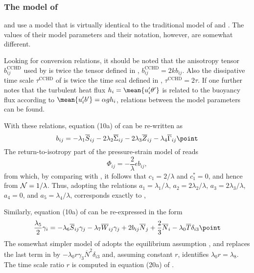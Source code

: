 \subsubsection{The model of \cite{Canutoetal2001a}}
\cite{Canutoetal2001a} and \cite{Chengetal2002} use a model 
that is virtually identical to the traditional model of
\cite{Launderetal75} and \cite{GibsonLaunder78}. The values 
of their model parameters and their notation, however, are somewhat
different.

Looking for conversion relations, it should be noted that the
anisotropy tensor $b^\text{CCHD}_{ij}$ used by \cite{Canutoetal2001a}
is twice the tensor defined in , $b^\text{CCHD}_{ij} = 2 k
b_{ij}$. Also the dissipative time scale $\tau^\text{CCHD}$ of
\cite{Canutoetal2001a} is twice the time scal defined in ,
$\tau^\text{CCHD} = 2 \tau$. If one further notes that the turbulent
heat flux $h_i=\mean{u'_i \theta'}$ is related to the buoyancy flux
according to $\mean{u'_i b'} = \alpha g h_i$, relations between the
model parameters can be found.

With these relations, equation (10a) of \cite{Canutoetal2001a} can be 
re-written as
\begin{equation}
  \label{bASMCHCD2001} 
    b_{ij} = - \lambda_1  \overline{S}_{ij} 
            - 2 \lambda_2 \overline{\Sigma}_{ij} 
            - 2 \lambda_3 \overline{Z}_{ij}
            -   \lambda_4 \overline{\Gamma}_{ij}
   \point
\end{equation}
The return-to-isotropy part of the pressure-strain model
of \cite{Canutoetal2001a} reads
\begin{equation}
  \label{PhiCHCD2001}
   \Phi_{ij} = - \dfrac{2}{\lambda} \epsilon b_{ij}
   \comma
\end{equation}
from which, by comparing with , it follows that $c_1 =
2/\lambda$ and $c^*_1 = 0$, and hence from  ${\cal N} =
1/\lambda$. Thus, adopting the relations $a_1 = \lambda_1/\lambda$,
$a_2 = 2 \lambda_2/\lambda$, $a_3 = 2 \lambda_3/\lambda$, $a_4 = 0$,
and $a_5 = \lambda_4/\lambda$,  corresponds exactly
to ,

Similarly, equation (10a) of \cite{Chengetal2002} can be re-expressed 
in the form
\begin{equation}
  \label{gammaASMCHCD2001}
  \dfrac{\lambda_5}{2}\gamma_{i} = 
  - \lambda_6  \overline{S}_{ij} \gamma_j 
  - \lambda_7  \overline{W}_{ij} \gamma_j 
  +     2        b_{ij} \overline{N}_{j}  
  + \dfrac{2}{3} \overline{N}_{i} 
  - \lambda_0  \overline{T} \delta_{i3}
  \point 
\end{equation}
The somewhat simpler model of \cite{Canutoetal2001a} adopts the
equilibrium assumption
, and replaces the last term in  by
$-\lambda_0 r \gamma_3 \overline{N}^2 \delta_{i3}$ and, assuming
constant $r$, identifies $\lambda_0 r = \lambda_8$. The time scale
ratio $r$ is computed in equation (20a) of \cite{Canutoetal2001a}.

